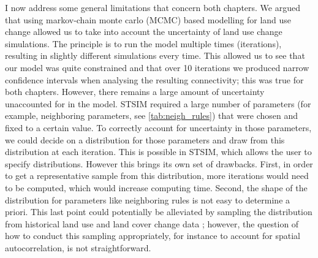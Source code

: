 \documentclass[12pt,Bold,TexShade]{thesis/mcgilletdclass}
\begin{document}
{I now address some general limitations that concern both chapters. We argued that using markov-chain monte carlo (MCMC) based modelling for land use change allowed us to take into account the uncertainty of land use change simulations. The principle is to run the model multiple times (iterations), resulting in slightly different simulations every time. This allowed us to see that our model was quite constrained and that over 10 iterations we produced narrow confidence intervals when analysing the resulting connectivity; this was true for both chapters. However, there remains a large amount of uncertainty unaccounted for in the model. STSIM required a large number of parameters (for example, neighboring parameters, see \ref{tab:neigh_rules}) that were chosen and fixed to a certain value. To correctly account for uncertainty in those parameters, we could decide on a distribution for those parameters and draw from this distribution at each iteration. This is possible in STSIM, which allows the user to specify distributions. However this brings its own set of drawbacks. First, in order to get a representative sample from this distribution, more iterations would need to be computed, which would increase computing time. Second, the shape of the distribution for parameters like neighboring rules is not easy to determine a priori. This last point could potentially be alleviated by sampling the distribution from historical land use and land cover change data ; however, the question of how to conduct this sampling appropriately, for instance to account for spatial autocorrelation, is not straightforward. \\

}
\end{document}
